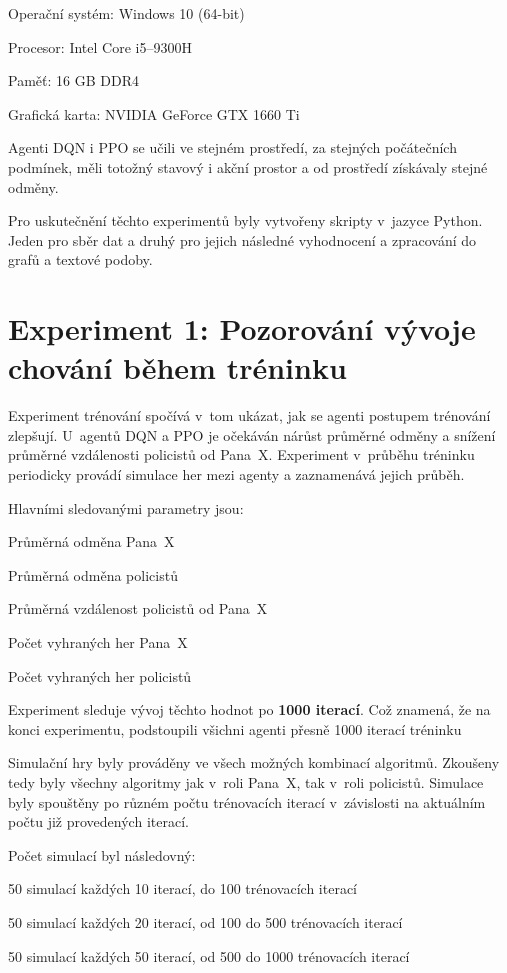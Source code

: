 \begin{myitemize}
  \item Operační systém: Windows 10 (64-bit)
  \item Procesor: Intel Core i5--9300H
  \item Paměť: 16 GB DDR4
  \item Grafická karta: NVIDIA GeForce GTX 1660 Ti
\end{myitemize}

Agenti DQN i PPO se učili ve stejném prostředí, za stejných počátečních podmínek, měli totožný stavový i akční prostor a od prostředí získávaly stejné odměny.

Pro uskutečnění těchto experimentů byly vytvořeny skripty v~jazyce Python.
Jeden pro sběr dat a druhý pro jejich následné vyhodnocení a zpracování do grafů a textové podoby.

\section{Experiment 1: Pozorování vývoje chování během tréninku}
\label{sec:experiment-1}

Experiment trénování spočívá v~tom ukázat, jak se agenti postupem trénování zlepšují.
U~agentů DQN a PPO je očekáván nárůst průměrné odměny a snížení průměrné vzdálenosti policistů od Pana~X\@.
Experiment v~průběhu tréninku periodicky provádí simulace her mezi agenty a zaznamenává jejich průběh.

\bigskip
\noindent Hlavními sledovanými parametry jsou:
\begin{myitemize}
  \item Průměrná odměna Pana~X
  \item Průměrná odměna policistů
  \item Průměrná vzdálenost policistů od Pana~X
  \item Počet vyhraných her Pana~X
  \item Počet vyhraných her policistů
\end{myitemize}
Experiment sleduje vývoj těchto hodnot po \textbf{1000 iterací}.
Což znamená, že na konci experimentu, podstoupili všichni agenti přesně 1000 iterací tréninku

Simulační hry byly prováděny ve všech možných kombinací algoritmů.
Zkoušeny tedy byly všechny algoritmy jak v~roli Pana~X, tak v~roli policistů.
Simulace byly spouštěny po různém počtu trénovacích iterací v~závislosti na aktuálním počtu již provedených iterací.\pagebreak

Počet simulací byl následovný:
\begin{myitemize}
  \item 50 simulací každých 10 iterací, do 100 trénovacích iterací
  \item 50 simulací každých 20 iterací, od 100 do 500 trénovacích iterací
  \item 50 simulací každých 50 iterací, od 500 do 1000 trénovacích iterací
\end{myitemize}

